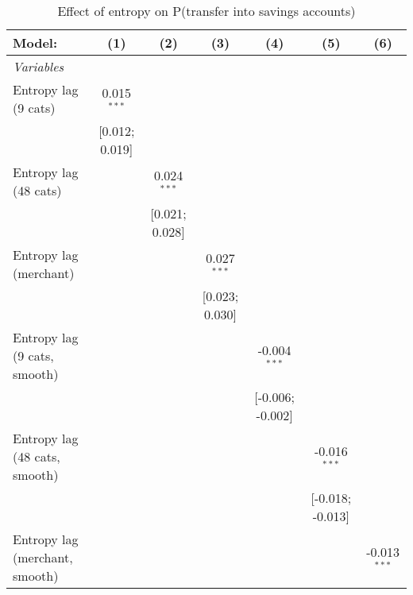 
\begin{table}[htbp]
   \centering
   \tiny
   \begin{threeparttable}[b]
      \caption{\label{tab:reg_has_inflows_lag} Effect of entropy on P(transfer into savings accounts)}
      \begin{tabular}{lcccccc}
         \tabularnewline \midrule \midrule
         Model:                         & (1)             & (2)             & (3)             & (4)              & (5)              & (6)\\  
         \midrule
         \emph{Variables}\\
         Entropy lag (9 cats)           & 0.015$^{***}$   &                 &                 &                  &                  &   \\   
                                        & [0.012; 0.019]  &                 &                 &                  &                  &   \\   
         Entropy lag (48 cats)          &                 & 0.024$^{***}$   &                 &                  &                  &   \\   
                                        &                 & [0.021; 0.028]  &                 &                  &                  &   \\   
         Entropy lag (merchant)         &                 &                 & 0.027$^{***}$   &                  &                  &   \\   
                                        &                 &                 & [0.023; 0.030]  &                  &                  &   \\   
         Entropy lag (9 cats, smooth)   &                 &                 &                 & -0.004$^{***}$   &                  &   \\   
                                        &                 &                 &                 & [-0.006; -0.002] &                  &   \\   
         Entropy lag (48 cats, smooth)  &                 &                 &                 &                  & -0.016$^{***}$   &   \\   
                                        &                 &                 &                 &                  & [-0.018; -0.013] &   \\   
         Entropy lag (merchant, smooth) &                 &                 &                 &                  &                  & -0.013$^{***}$\\   

\end{tabular}
\end{threeparttable}
\end{table}
